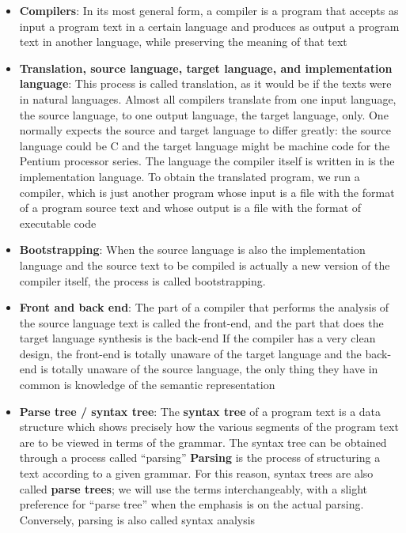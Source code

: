 \documentclass{report}
\begin{document}
    \begin{itemize}
        \item \textbf{Compilers}: In its most general form, a compiler is a program that accepts as input a program text in a certain language and produces as output a program text in another language, while preserving the meaning of that text
        \item \textbf{Translation, source language, target language, and implementation language}: This process is called translation, as it would be if the texts were in natural languages. Almost all compilers translate from one input language, the source language, to one output language, the target language, only. One normally expects the source and target language to differ greatly: the source language could be C and the target language might be machine code for the Pentium processor series. The language the compiler itself is written in is the implementation language.
            \bigbreak \noindent 
            To obtain the translated program, we run a compiler, which is just another program whose input is a file with the format of a program source text and whose output is a file with the format of executable code
        \item \textbf{Bootstrapping}: When the source language is also the implementation language and the source text to be compiled is actually a new version of the compiler itself, the process is called bootstrapping. 
        \item \textbf{Front and back end}: The part of a compiler that performs the analysis of the source language text is called the front-end, and the part that does the target language synthesis is the back-end
            \bigbreak \noindent 
            If the compiler has a very clean design, the front-end is totally unaware of the target language and the back-end is totally unaware of the source language, the only thing they have in common is knowledge of the semantic representation
        \item \textbf{Parse tree / syntax tree}: The \textbf{syntax tree} of a program text is a data structure which shows precisely how the various segments of the program text are to be viewed in terms of the grammar. The syntax tree can be obtained through a process called “parsing”
            \bigbreak \noindent 
            \textbf{Parsing} is the process of structuring a text according to a given grammar. For this reason, syntax trees are also called \textbf{parse trees}; we will use the terms interchangeably, with a slight preference for “parse tree” when the emphasis is on the actual parsing. Conversely, parsing is also called syntax analysis

\end{itemize}
\end{document}
